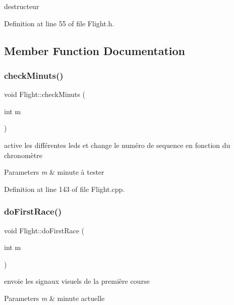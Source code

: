 destructeur 



Definition at line 55 of file Flight.\+h.



\subsection{Member Function Documentation}
\mbox{\label{class_flight_abbbb8270b5c7706608a321ccb927f5a4}} 
\subsubsection{\texorpdfstring{check\+Minuts()}{checkMinuts()}}
{\footnotesize\ttfamily void Flight\+::check\+Minuts (\begin{DoxyParamCaption}\item[{int}]{m }\end{DoxyParamCaption})}



active les différentes leds et change le numéro de sequence en fonction du chronomètre 


\begin{DoxyParams}{Parameters}
{\em m} & minute à tester \\
\hline
\end{DoxyParams}


Definition at line 143 of file Flight.\+cpp.

\mbox{\label{class_flight_a8bde7d624b00590fae1da4eb9e682ceb}} 
\subsubsection{\texorpdfstring{do\+First\+Race()}{doFirstRace()}}
{\footnotesize\ttfamily void Flight\+::do\+First\+Race (\begin{DoxyParamCaption}\item[{int}]{m }\end{DoxyParamCaption})}



envoie les signaux visuels de la première course 


\begin{DoxyParams}{Parameters}
{\em m} & minute actuelle \\
\hline
\end{DoxyParams}



